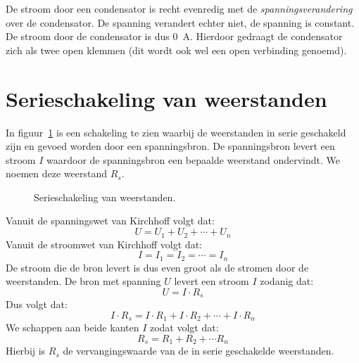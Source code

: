 De stroom door een condensator is recht evenredig met de \textsl{spanningsverandering} over de condensator. De spanning verandert echter niet, de spanning is constant. De stroom door de condensator is dus \SI{0}{\ampere}. Hierdoor gedraagt de condensator zich als twee open klemmen (dit wordt ook wel een open verbinding genoemd).


\section{Serieschakeling van weerstanden}
In figuur~\ref{fig:gelserieschakelingweerstanden} is een schakeling te zien waarbij de weerstanden
in serie geschakeld zijn en gevoed worden door een spanningsbron. De spanningsbron levert een stroom
$I$ waardoor de spanningsbron een bepaalde weerstand ondervindt. We noemen deze weerstand $R_s$.

\begin{figure}[!ht]
\centering
{}
\caption{Serieschakeling van weerstanden.}
\label{fig:gelserieschakelingweerstanden}
\end{figure}

Vanuit de spanningswet van Kirchhoff volgt dat:
%
\begin{equation}
U=U_1+U_2+\cdots+U_n
\end{equation}
%
Vanuit de stroomwet van Kirchhoff volgt dat:
%
\begin{equation}
I = I_1 = I_2 = \cdots = I_n
\end{equation}
%
De stroom die de bron levert is dus even groot als de stromen door de weerstanden.
De bron met spanning $U$ levert een stroom $I$ zodanig dat:
%
\begin{equation}
U=I\cdot R_s
\end{equation}
%
Dus volgt dat:
%
\begin{equation}
I\cdot R_s = I\cdot R_1+I\cdot R_2+\cdots+I\cdot R_n
\end{equation}
%
We schappen aan beide kanten $I$ zodat volgt dat:
%
\begin{equation}
R_s = R_1 + R_2 + \cdots R_n
\end{equation}
%
Hierbij is $R_s$ de vervangingswaarde van de in serie geschakelde weerstanden.

